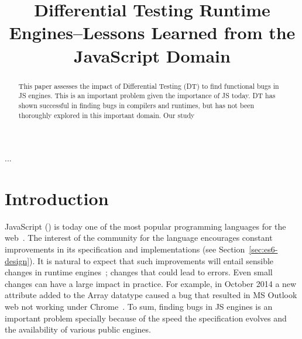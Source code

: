 \documentclass[10pt,conference,anonymous]{IEEEtran}
\begin{document}
\title{Differential Testing Runtime Engines--Lessons Learned from the
  JavaScript Domain}


\maketitle

\thispagestyle{plain}
\pagestyle{plain}

\begin{abstract}
This paper assesses the impact of Differential Testing (DT) to find
functional bugs in JS engines. This is an important problem given the
importance of JS today. DT has shown successful in finding bugs in
compilers and runtimes, but has not been thoroughly explored in this
important domain. Our study 
\end{abstract}

\begin{IEEEkeywords}
...
\end{IEEEkeywords}

\section{Introduction}

JavaScript (\js{}) is today one of the most popular programming
languages for the web~\cite{business-insider,stackify}. The interest
of the community for the language encourages constant improvements in
its specification and implementations (see
Section~\ref{sec:es6-design}). It is natural to expect that such
improvements will entail sensible changes in runtime
engines~\cite{kangax}; changes that could lead to errors. Even small
changes can have a large impact in practice. For example, in October
2014 a new attribute added to the Array datatype caused a bug that
resulted in MS Outlook web not working under
Chrome~\cite{array-bug-chromium-issue4247,array-bug-discussion}. To
sum, finding bugs in JS engines is an important problem specially
because of the speed the specification evolves and the availability of
various public engines.
\end{document}
